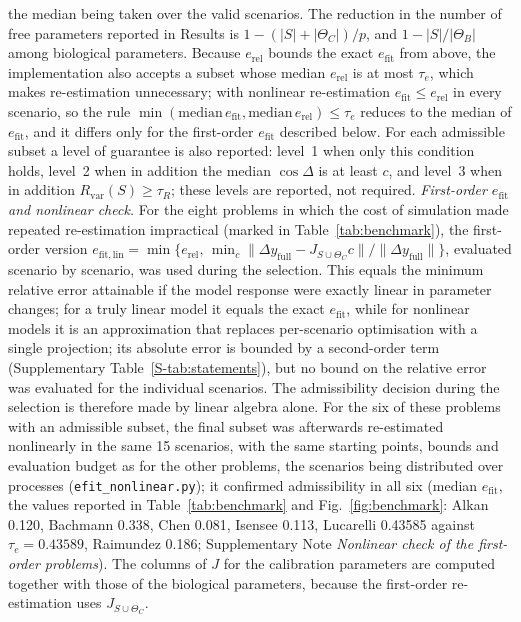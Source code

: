 \documentclass[pdflatex,sn-nature]{sn-jnl}
\theoremstyle{plain}
\begin{document}
the median being taken over the valid scenarios. The reduction in the number of free parameters reported in Results is $1-(|S|+|\Theta_C|)/p$, and $1-|S|/|\Theta_B|$ among biological parameters. Because $e_{\mathrm{rel}}$ bounds the exact $e_{\mathrm{fit}}$ from above, the implementation also accepts a subset whose median $e_{\mathrm{rel}}$ is at most $\tau_e$, which makes re-estimation unnecessary; with nonlinear re-estimation $e_{\mathrm{fit}}\le e_{\mathrm{rel}}$ in every scenario, so the rule $\min(\mathrm{median}\,e_{\mathrm{fit}},\mathrm{median}\,e_{\mathrm{rel}})\le\tau_e$ reduces to the median of $e_{\mathrm{fit}}$, and it differs only for the first-order $e_{\mathrm{fit}}$ described below. For each admissible subset a level of guarantee is also reported: level~1 when only this condition holds, level~2 when in addition the median $\cos\Delta$ is at least $c$, and level~3 when in addition $R_{\mathrm{var}}(S)\ge\tau_R$; these levels are reported, not required. \label{met:adm-firstorder}\emph{First-order $e_{\mathrm{fit}}$ and nonlinear check.} For the eight problems in which the cost of simulation made repeated re-estimation impractical (marked in Table~\ref{tab:benchmark}), the first-order version $e_{\mathrm{fit,lin}}=\min\{e_{\mathrm{rel}},\,\min_c\|\Delta y_{\mathrm{full}}-J_{S\cup\Theta_C}c\|/\|\Delta y_{\mathrm{full}}\|\}$, evaluated scenario by scenario, was used during the selection. This equals the minimum relative error attainable if the model response were exactly linear in parameter changes; for a truly linear model it equals the exact $e_{\mathrm{fit}}$, while for nonlinear models it is an approximation that replaces per-scenario optimisation with a single projection; its absolute error is bounded by a second-order term (Supplementary Table~\ref{S-tab:statements}), but no bound on the relative error was evaluated for the individual scenarios. The admissibility decision during the selection is therefore made by linear algebra alone. For the six of these problems with an admissible subset, the final subset was afterwards re-estimated nonlinearly in the same 15 scenarios, with the same starting points, bounds and evaluation budget as for the other problems, the scenarios being distributed over processes (\texttt{efit\_nonlinear.py}); it confirmed admissibility in all six (median $e_{\mathrm{fit}}$, the values reported in Table~\ref{tab:benchmark} and Fig.~\ref{fig:benchmark}: Alkan 0.120, Bachmann 0.338, Chen 0.081, Isensee 0.113, Lucarelli 0.43585 against $\tau_e=0.43589$, Raimundez 0.186; Supplementary Note \textit{Nonlinear check of the first-order problems}). The columns of $J$ for the calibration parameters are computed together with those of the biological parameters, because the first-order re-estimation uses $J_{S\cup\Theta_C}$.
\end{document}
